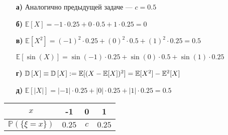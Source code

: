 \documentclass{article}
\begin{document}
\begin{itemize}
    \item[\textbf{а)}] Аналогично предыдущей задаче — $c=0.5$

    \item[\textbf{б)}] $\mathbb{E}[X] = -1\cdot0.25 + 0\cdot0.5+1\cdot0.25 = 0$
    \item[\textbf{в)}] $\mathbb{E}[X^2] = (-1)^2\cdot0.25 + (0)^2\cdot0.5 + (1)^2\cdot0.25 = 0.5$

    $\mathbb{E}[\sin{(X)}] = \sin(-1)\cdot0.25 + \sin(0)\cdot0.5 + \sin(1)\cdot0.25$
    \item[\textbf{г)}] $\mathbb{D}\left[X\right] \equiv \mathbb{D}\left[X\right] := \mathbb{E}[(X-\mathbb{E}[X])^2] = \mathbb{E}[X^2]- \mathbb{E}^2[X]$
    \item[\textbf{д)}] $\mathbb{E}[|X|] = |-1|\cdot0.25 + |0|\cdot0.25 + |1|\cdot0.25 = 0.5$

\end{itemize}

\begin{table}[h]
    \begin{tabular}{|c|c|c|c|}
        \hline
        $x$ & -1 & 0 & 1 \\
        \hline
        $\mathbb{P}(\{\xi = x\})$ & $0.25$ & $c$ & $0.25$ \\
        \hline
    \end{tabular}
\end{table}
\end{document}

